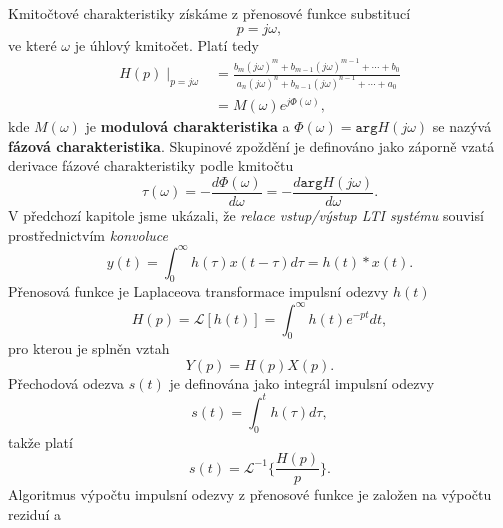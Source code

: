       Kmitočtové charakteristiky získáme z přenosové funkce substitucí
      \begin{equation}\label{SAS:eq_p_jomega}
          p = j\omega,
      \end{equation}
      ve které $\omega$ je úhlový kmitočet. Platí tedy
      \begin{align}
          H(p)\mid_{p = j\omega} 
            &=\frac{b_m(j\omega)^m+b_{m-1}(j\omega)^{m-1}                     
             +\cdots+b_0}{a_n(j\omega)^n+b_{n-1}(j\omega)^{n-1}+\cdots+a_0}      \nonumber \\
            &=M(\omega)e^{j\Phi(\omega)},                                        \label{tky:eq003}
      \end{align}
      kde $M(\omega)$ je \textbf{modulová charakteristika} a $\Phi(\omega)=\texttt{arg}H(j\omega)$ 
      se nazývá \textbf{fázová charakteristika}. Skupinové zpoždění je definováno jako záporně vzatá
      derivace fázové charakteristiky podle kmitočtu
      \begin{equation}\label{SAS:eq_skupinove_zpozdeni}
          \tau(\omega)=-\frac{d\Phi(\omega)}{d\omega}= - \frac{d \texttt{arg} H(j\omega)}{d\omega}.
      \end{equation}
      V předchozí kapitole jsme ukázali, že \emph{relace vstup/výstup LTI systému} souvisí
      pro\-střed\-nic\-tvím \emph{konvoluce}
      \begin{equation}\label{SAS:eq_popis_konvoluce}
          y(t)=\int_0^\infty h(\tau)x(t-\tau)d\tau = h(t)*x(t).
      \end{equation}
      Přenosová funkce je Laplaceova transformace impulsní odezvy $h(t)$
      \begin{equation}\label{SAS:eq_ht_Lap_trans_imp}
          H(p)=\mathcal{L}[h(t)]=\int_0^\infty h(t)e^{-pt}dt,
      \end{equation}
      pro kterou je splněn vztah
      \begin{equation}\label{SAS:eq_Yp}
          Y(p)=H(p)X(p).
      \end{equation}
      Přechodová odezva $s(t)$ je definována jako integrál impulsní odezvy
      \begin{equation}\label{SAS:eq_Prechod_odezva}
          s(t)=\int_0^th(\tau)d\tau,
      \end{equation}
      takže platí
      \begin{equation}\label{SAS:eq_st}
          s(t)=\mathcal{L}^{-1}\{\frac{H(p)}{p}\}.
      \end{equation}
      Algoritmus výpočtu impulsní odezvy z přenosové funkce je založen na výpočtu  reziduí a 
